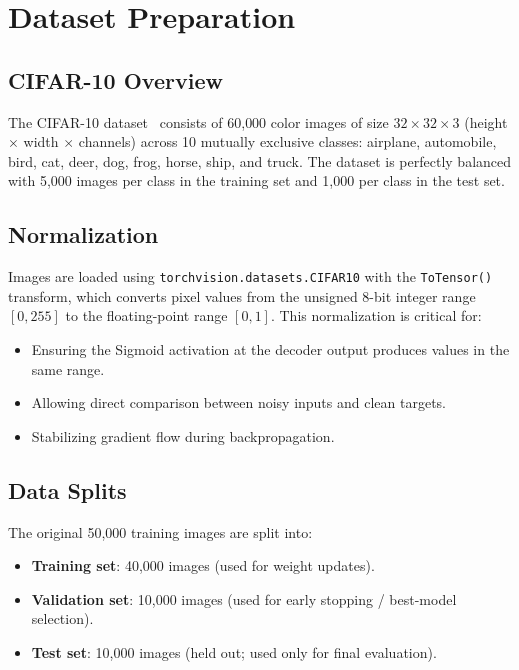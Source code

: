 \documentclass[runningheads]{llncs}
\begin{document}
\section{Dataset Preparation}
\label{sec:dataset}

\subsection{CIFAR-10 Overview}
The CIFAR-10 dataset~\cite{krizhevsky2009learning} consists of 60{,}000 color images of size $32 \times 32 \times 3$ (height $\times$ width $\times$ channels) across 10 mutually exclusive classes: airplane, automobile, bird, cat, deer, dog, frog, horse, ship, and truck. The dataset is perfectly balanced with 5{,}000 images per class in the training set and 1{,}000 per class in the test set.

\subsection{Normalization}
Images are loaded using \texttt{torchvision.datasets.CIFAR10} with the \texttt{ToTensor()} transform, which converts pixel values from the unsigned 8-bit integer range $[0, 255]$ to the floating-point range $[0, 1]$. This normalization is critical for:
\begin{itemize}[nosep]
    \item Ensuring the Sigmoid activation at the decoder output produces values in the same range.
    \item Allowing direct comparison between noisy inputs and clean targets.
    \item Stabilizing gradient flow during backpropagation.
\end{itemize}

\subsection{Data Splits}
The original 50{,}000 training images are split into:
\begin{itemize}[nosep]
    \item \textbf{Training set}: 40{,}000 images (used for weight updates).
    \item \textbf{Validation set}: 10{,}000 images (used for early stopping / best-model selection).
    \item \textbf{Test set}: 10{,}000 images (held out; used only for final evaluation).
\end{itemize}
\end{document}
